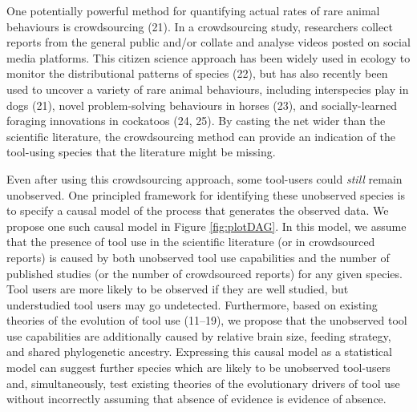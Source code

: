 \documentclass[
  man, donotrepeattitle,floatsintext]{apa6}
\begin{document}
One potentially powerful method for quantifying actual rates of rare animal
behaviours is crowdsourcing (21). In a crowdsourcing study, researchers
collect reports from the general public and/or collate and analyse videos posted
on social media platforms. This citizen science approach has been widely used in
ecology to monitor the distributional patterns of species (22), but
has also recently been used to uncover a variety of rare animal behaviours,
including interspecies play in dogs (21), novel problem-solving
behaviours in horses (23), and socially-learned foraging innovations
in cockatoos (24, 25). By casting the net wider than the
scientific literature, the crowdsourcing method can provide an indication of the
tool-using species that the literature might be missing.

Even after using this crowdsourcing approach, some tool-users could \emph{still}
remain unobserved. One principled framework for identifying these unobserved species
is to specify a causal model of the process that generates the observed data. We
propose one such causal model in Figure \ref{fig:plotDAG}. In this model, we
assume that the presence of tool use in the scientific literature (or in
crowdsourced reports) is caused by both unobserved tool use capabilities and the
number of published studies (or the number of crowdsourced reports) for any
given species. Tool users are more likely to be observed if they are well
studied, but understudied tool users may go undetected. Furthermore, based on
existing theories of the evolution of tool use (11--19), we propose that the
unobserved tool use capabilities are additionally caused by relative brain size,
feeding strategy, and shared phylogenetic ancestry. Expressing this causal model
as a statistical model can suggest further species which are likely to be
unobserved tool-users and, simultaneously, test existing theories of the
evolutionary drivers of tool use without incorrectly assuming that absence of
evidence is evidence of absence.
\end{document}

